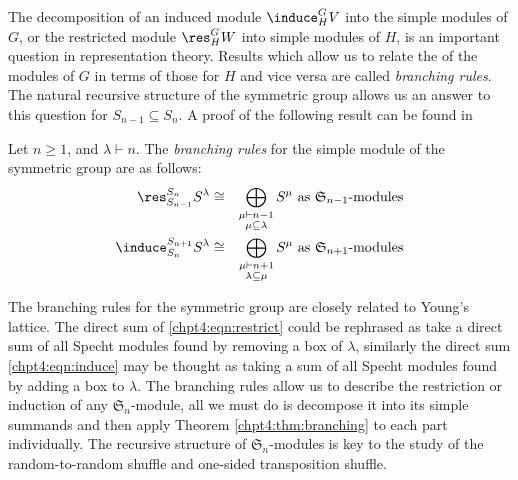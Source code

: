 \documentclass[11pt]{report}
\begin{document}
The decomposition of an induced module $\induce_{H}^{G} V$ into the simple modules of $G$, or the restricted module $\res_{H}^{G} W$ into simple modules of $H$, is an important question in representation theory.
Results which allow us to relate the of the modules of $G$ in terms of those for $H$ and vice versa are called \emph{branching rules}. The natural recursive structure of the symmetric group allows us an answer to this question for $S_{n-1} \subseteq S_{n}$. A proof of the following result can be found in \cite[Theorem 2.8.3]{sagan2013symmetric}

\begin{thm}
	\label{chpt4:thm:branching}
	Let $n \geq 1$, and $\lambda \vdash n$. The \emph{branching rules} for the simple module of the symmetric group are as follows:
	\begin{eqnarray}
	\res_{S_{n-1}}^{S_{n}} S^{\lambda} & \cong & \bigoplus_{\substack{\mu \vdash n-1 \\ \mu \subseteq \lambda}} S^{\mu} \textnormal{ as $\mathfrak{S}_{n-1}$-modules}\label{chpt4:eqn:restrict}\\
	\induce_{S_{n}}^{S_{n+1}} S^{\lambda} & \cong &\bigoplus_{\substack{\mu \vdash n+1 \\ \lambda \subseteq \mu }} S^{\mu} \textnormal{ as $\mathfrak{S}_{n+1}$-modules} \label{chpt4:eqn:induce}
	\end{eqnarray}
\end{thm}	
The branching rules for the symmetric group are closely related to Young's lattice. The direct sum of \eqref{chpt4:eqn:restrict} could be rephrased as take a direct sum of all Specht modules found by removing a box of $\lambda$, similarly the direct sum \eqref{chpt4:eqn:induce} may be thought as taking a sum of all Specht modules found by adding a box to $\lambda$. The branching rules allow us to describe the restriction or induction of any $\mathfrak{S}_{n}$-module, all we must do is decompose it into its simple summands and then apply Theorem \ref{chpt4:thm:branching} to each part individually. The recursive structure of $\mathfrak{S}_{n}$-modules is key to the study of the random-to-random shuffle and one-sided transposition shuffle. 
\end{document}
